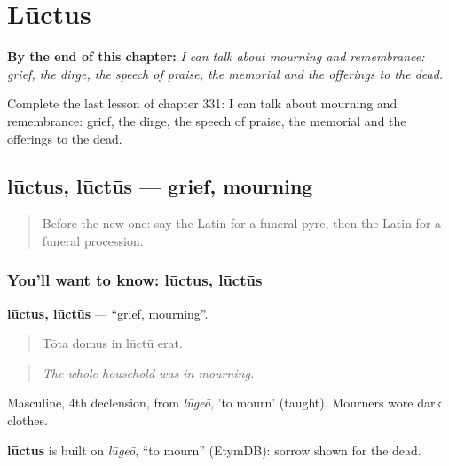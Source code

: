 
\chapter{Lūctus}
\label{ch:la-luctus}

\begin{chapteropening}
\textbf{By the end of this chapter:} \emph{I can talk about mourning and remembrance: grief, the dirge, the speech of praise, the memorial and the offerings to the dead.}

Complete the last lesson of chapter 331: I can talk about mourning and remembrance: grief, the dirge, the speech of praise, the memorial and the offerings to the dead.
\end{chapteropening}

\section[lūctus, lūctūs]{lūctus, lūctūs — grief, mourning}

\label{lesson:LA-C331-luctus}



\begin{quote}
Before the new one: say the Latin for a funeral pyre, then the Latin for a funeral procession.
\end{quote}

\subsection*{You'll want to know: lūctus, lūctūs}
\textbf{lūctus, lūctūs} — \textquotedblleft{}grief, mourning\textquotedblright{}.

\begin{quote}
Tōta domus in lūctū erat.
\end{quote}

\begin{quote}
\emph{The whole household was in mourning.}
\end{quote}

Masculine, 4th declension, from \emph{lūgeō}, 'to mourn' (taught). Mourners wore dark clothes.

\begin{cousinweb}
\textbf{lūctus} is built on \emph{lūgeō}, \textquotedblleft{}to mourn\textquotedblright{} (EtymDB): sorrow shown for the dead.
\end{cousinweb}

